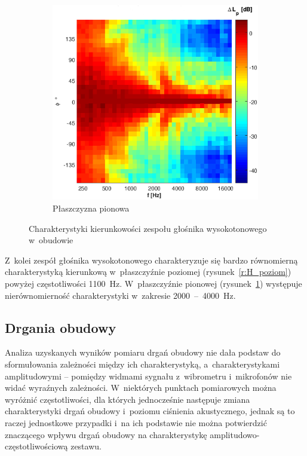 \documentclass[12pt]{oska}
\newcommand{\range}[2]{\num{#1}~--~\num{#2}}
\begin{document}
\begin{figure}[!ht]
		\begin{subfigure}[b]{.7\textwidth}
			\includegraphics[width=\textwidth]{pion_H_2.png}
			\caption{Płaszczyzna pionowa}
			\label{r:H_pion}
		\end{subfigure}
		\caption{Charakterystyki kierunkowości zespołu głośnika wysokotonowego w~obudowie}
		\label{r:kierunkowosc_H}
	\end{figure}
	
	Z~kolei zespół głośnika wysokotonowego charakteryzuje się bardzo równomierną charakterystyką kierunkową w~płaszczyźnie poziomej (rysunek~\ref{r:H_poziom}) powyżej częstotliwości \SI{1100}{Hz}. W~płaszczyźnie pionowej (rysunek~\ref{r:H_pion}) występuje nierównomierność charakterystyki w~zakresie \range{2000}{4000}~\si{\hertz}.
	
	
	
	\subsection{Drgania obudowy}
	
	Analiza uzyskanych wyników pomiaru drgań obudowy nie dała podstaw do sformułowania zależności między ich charakterystyką, a~charakterystykami amplitudowymi -- pomiędzy widmami sygnału z~wibrometru i~mikrofonów nie widać wyraźnych zależności. W~niektórych punktach pomiarowych można wyróżnić częstotliwości, dla których jednocześnie następuje zmiana charakterystyki drgań obudowy i~poziomu ciśnienia akustycznego, jednak są to raczej jednostkowe przypadki i~na ich podstawie nie można potwierdzić znaczącego wpływu drgań obudowy na charakterystykę amplitudowo-częstotliwościową zestawu.
	
\end{document}
